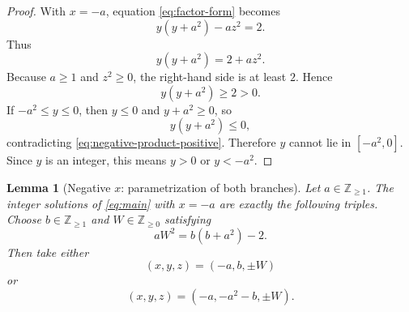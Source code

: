 \documentclass[11pt]{article}
\newtheorem{lemma}[theorem]{Lemma}
\theoremstyle{remark}
\newcommand{\Zge}{\mathbb Z_{\ge 0}}
\newcommand{\Zpos}{\mathbb Z_{\ge 1}}
\begin{document}
\begin{proof}
With $x=-a$, equation \eqref{eq:factor-form} becomes
\begin{equation}\label{eq:negative-factor}
        y(y+a^2)-az^2=2.
\end{equation}
Thus
\begin{equation}\label{eq:negative-product}
        y(y+a^2)=2+az^2.
\end{equation}
Because $a\ge 1$ and $z^2\ge 0$, the right-hand side is at least $2$.  Hence
\begin{equation}\label{eq:negative-product-positive}
        y(y+a^2)\ge 2>0.
\end{equation}
If $-a^2\le y\le 0$, then $y\le 0$ and $y+a^2\ge 0$, so
\[
        y(y+a^2)\le 0,
\]
contradicting \eqref{eq:negative-product-positive}.  Therefore $y$ cannot lie in $[-a^2,0]$.  Since $y$ is an integer, this means $y>0$ or $y<-a^2$.
\end{proof}

\begin{lemma}[Negative $x$: parametrization of both branches]\label{lem:negative-branches}
Let $a\in\Zpos$.  The integer solutions of \eqref{eq:main} with $x=-a$ are exactly the following triples.  Choose $b\in\Zpos$ and $W\in\Zge$ satisfying
\[
        aW^2=b(b+a^2)-2.
\]
Then take either
\[
        (x,y,z)=(-a,b,\pm W)
\]
or
\[
        (x,y,z)=(-a,-a^2-b,\pm W).
\]
\end{lemma}
\end{document}
